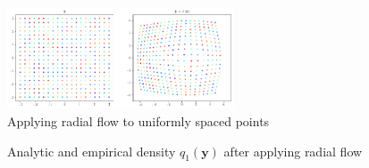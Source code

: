 \documentclass[]{article}
\begin{document}
\begin{figure}
	\centering
	\includegraphics[width=0.6\textwidth]{radial-points}
	\caption{Applying radial flow to uniformly spaced points}
		\label{fig:radial-points}
\end{figure}

\begin{figure}
	\centering
	\caption{Analytic and empirical density $q_1(\mathbf{y})$ after applying radial flow}
		\label{fig:q1-radial}
\end{figure}
\end{document}
